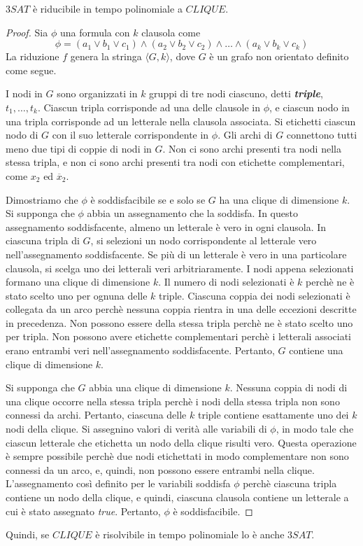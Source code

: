 \documentclass[12pt]{report}
\newcounter{theorem}
\begin{document}
\begin{theorem}{}{}
	$3SAT$ è riducibile in tempo polinomiale a $CLIQUE$.
\end{theorem}
\begin{proof}
	Sia $\phi$ una formula con $k$ clausola come
	\[
	\phi = (a_1 \vee b_1 \vee c_1) \wedge (a_2 \vee b_2 \vee c_2) \wedge \dots \wedge (a_k \vee b_k \vee c_k)
	\]
	La riduzione $f$ genera la stringa $\langle G, k \rangle$, dove $G$ è un grafo non orientato definito come segue.

	I nodi in $G$ sono organizzati in $k$ gruppi di tre nodi ciascuno, detti \textbf{\textit{triple}}, $t_1, \dots, t_k$. Ciascun tripla corrisponde ad una delle clausole in $\phi$, e ciascun nodo in una tripla corrisponde ad un letterale nella clausola associata. Si etichetti ciascun nodo di $G$ con il suo letterale corrispondente in $\phi$. Gli archi di $G$ connettono tutti meno due tipi di coppie di nodi in $G$. Non ci sono archi presenti tra nodi nella stessa tripla, e non ci sono archi presenti tra nodi con etichette complementari, come $x_2$ ed $\overline{x}_2$.

	Dimostriamo che $\phi$ è soddisfacibile se e solo se $G$ ha una clique di dimensione $k$. Si supponga che $\phi$ abbia un assegnamento che la soddisfa. In questo assegnamento soddisfacente, almeno un letterale è vero in ogni clausola. In ciascuna tripla di $G$, si selezioni un nodo corrispondente al letterale vero nell'assegnamento soddisfacente. Se più di un letterale è vero in una particolare clausola, si scelga uno dei letterali veri arbitriaramente. I nodi appena selezionati formano una clique di dimensione $k$. Il numero di nodi selezionati è $k$ perchè ne è stato scelto uno per ognuna delle $k$ triple. Ciascuna coppia dei nodi selezionati è collegata da un arco perchè nessuna coppia rientra in una delle eccezioni descritte in precedenza. Non possono essere della stessa tripla perchè ne è stato scelto uno per tripla. Non possono avere etichette complementari perchè i letterali associati erano entrambi veri nell'assegnamento soddisfacente. Pertanto, $G$ contiene una clique di dimensione $k$.

	Si supponga che $G$ abbia una clique di dimensione $k$. Nessuna coppia di nodi di una clique occorre nella stessa tripla perchè i nodi della stessa tripla non sono connessi da archi. Pertanto, ciascuna delle $k$ triple contiene esattamente uno dei $k$ nodi della clique. Si assegnino valori di verità alle variabili di $\phi$, in modo tale che ciascun letterale che etichetta un nodo della clique risulti vero.  Questa operazione è sempre possibile perchè due nodi etichettati in modo complementare non sono connessi da un arco, e, quindi, non possono essere entrambi nella clique. L'assegnamento così definito per le variabili soddisfa $\phi$ perchè ciascuna tripla contiene un nodo della clique, e quindi, ciascuna clausola contiene un letterale a cui è stato assegnato \textit{true}. Pertanto, $\phi$ è soddisfacibile.
\end{proof}
Quindi, se $CLIQUE$ è risolvibile in tempo polinomiale lo è anche $3SAT$.
\end{document}
